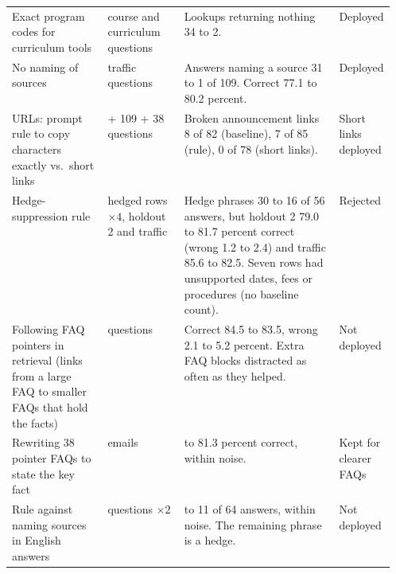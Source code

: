 \begin{table}[htbp]
\begin{tabularx}{\linewidth}{@{}>{\raggedright\arraybackslash}p{0.25\linewidth}>{\raggedright\arraybackslash}p{0.2\linewidth}>{\raggedright\arraybackslash}X>{\raggedright\arraybackslash}p{0.11\linewidth}@{}}
Exact program codes for curriculum tools & 63 course and curriculum questions & Lookups returning nothing 34 to 2. & Deployed \\
No naming of sources & 109 traffic questions & Answers naming a source 31 to 1 of 109. Correct 77.1 to 80.2 percent. & Deployed \\
URLs: prompt rule to copy characters exactly vs.\ short links & 334 + 109 + 38 questions & Broken announcement links 8 of 82 (baseline), 7 of 85 (rule), 0 of 78 (short links). & Short links deployed \\
\midrule
Hedge-suppression rule & 14 hedged rows $\times4$, holdout 2 and traffic & Hedge phrases 30 to 16 of 56 answers, but holdout 2 79.0 to 81.7 percent correct (wrong 1.2 to 2.4) and traffic 85.6 to 82.5. Seven rows had unsupported dates, fees or procedures (no baseline count). & Rejected \\
Following FAQ pointers in retrieval (links from a large FAQ to smaller FAQs that hold the facts) & 99 questions & Correct 84.5 to 83.5, wrong 2.1 to 5.2 percent. Extra FAQ blocks distracted as often as they helped. & Not deployed \\
Rewriting 38 pointer FAQs to state the key fact & 334 emails & 83.6 to 81.3 percent correct, within noise. & Kept for clearer FAQs \\
Rule against naming sources in English answers & 32 questions $\times2$ & 15 to 11 of 64 answers, within noise. The remaining phrase is a hedge. & Not deployed \\
\bottomrule
\end{tabularx}
\end{table}
